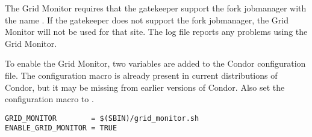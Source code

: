 The Grid Monitor requires that the gatekeeper support the fork
jobmanager with the name .
If the gatekeeper does not support the fork jobmanager,
the Grid Monitor will not be used for that site.
The  log file reports any problems
using the Grid Monitor.

To enable the Grid Monitor,
two variables are added to the Condor configuration file.
The configuration macro 
is already present in current distributions of Condor,
but it may be missing from earlier versions of Condor.
Also set the configuration macro 
to .

\begin{verbatim}
GRID_MONITOR        = $(SBIN)/grid_monitor.sh
ENABLE_GRID_MONITOR = TRUE
\end{verbatim}

